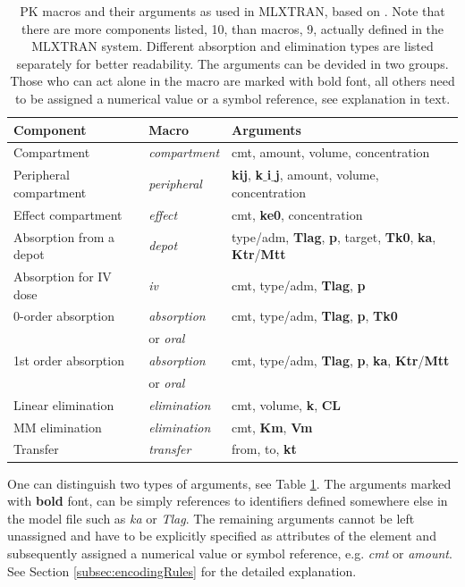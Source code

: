 \begin{table}[ht!]
\begin{center}
\begin{tabular}{lll}
  \hline
  \hline
Component & Macro & Arguments \\
  \hline
Compartment 			& \textit{compartment}	 	& cmt, amount, volume, concentration \\
Peripheral compartment	& \textit{peripheral}			& \textbf{kij}, \textbf{k$\_$i$\_$j}, amount, volume, concentration \\
Effect compartment 		& \textit{effect} 				& cmt, \textbf{ke0}, concentration \\
Absorption from a depot 	& \textit{depot} 				& type/adm, \textbf{Tlag}, \textbf{p}, target, \textbf{Tk0}, \textbf{ka}, \textbf{Ktr}/\textbf{Mtt} \\
Absorption for IV dose 	& \textit{iv} 				& cmt, type/adm, \textbf{Tlag}, \textbf{p} \\
0-order absorption 		& \textit{absorption}			& cmt, type/adm, \textbf{Tlag}, \textbf{p}, \textbf{Tk0} \\[-.5ex]
					& or \textit{oral}				& \\
1st order absorption 	& \textit{absorption}			& cmt, type/adm, \textbf{Tlag}, \textbf{p}, \textbf{ka}, \textbf{Ktr}/\textbf{Mtt} \\[-.5ex]
					& or \textit{oral}				& \\
Linear elimination 		& \textit{elimination}			& cmt, volume, \textbf{k}, \textbf{CL} \\
MM elimination 		& \textit{elimination}			& cmt, \textbf{Km}, \textbf{Vm} \\
Transfer 				& \textit{transfer}			& from, to, \textbf{kt} \\
  \hline
\end{tabular}
\caption{PK macros and their arguments as used in MLXTRAN, based on 
\cite{MLXTRANforMonolix:2014}. Note that there are more components listed, 
10, than macros, 9, actually defined in the MLXTRAN system. Different absorption 
and elimination types are listed separately for better readability. The arguments can be 
devided in two groups. Those who can act alone in the macro are marked with bold font,
all others need to be assigned a numerical value or a symbol reference, see explanation in text.}
\label{tab:MLXPLORElibrary}
\end{center}
\end{table}
One can distinguish two types of arguments, see Table \ref{tab:MLXPLORElibrary}. 
The arguments marked with \textbf{bold} font, can be simply references to identifiers 
defined somewhere else in the model file such as \emph{ka} or \emph{Tlag}. The remaining 
arguments cannot be left unassigned and have to be explicitly specified as attributes 
of the  element and subsequently assigned a numerical value or 
symbol reference, e.g. \emph{cmt} or \emph{amount}. See Section 
\ref{subsec:encodingRules} for the detailed explanation.

